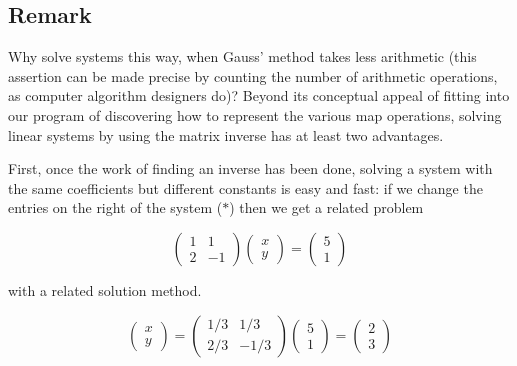 \subsection{Remark}
\label{sss:rema-911c}




Why solve systems this way, when Gauss' method takes less arithmetic (this assertion can
be made precise by counting the number of arithmetic operations, as computer algorithm
designers do)? Beyond its conceptual appeal of fitting into our program of discovering how
to represent the various map operations, solving linear systems by using the matrix
inverse has at least two advantages.



First, once the work of finding an inverse has been done, solving a system with the same
coefficients but different constants is easy and fast: if we change the entries on the
right of the system ($*$) then we get a related problem



$$\begin{pmatrix} 1  & 1  \\ 2  & -1 \end{pmatrix} \begin{pmatrix} x \\ y \end{pmatrix} = \begin{pmatrix} 5 \\ 1 \end{pmatrix}$$



with a related solution method.



$$\begin{pmatrix} x \\ y \end{pmatrix} = \begin{pmatrix} 1/3  & 1/3  \\ 2/3  & -1/3 \end{pmatrix} \begin{pmatrix} 5 \\ 1 \end{pmatrix} = \begin{pmatrix} 2 \\ 3 \end{pmatrix}$$



